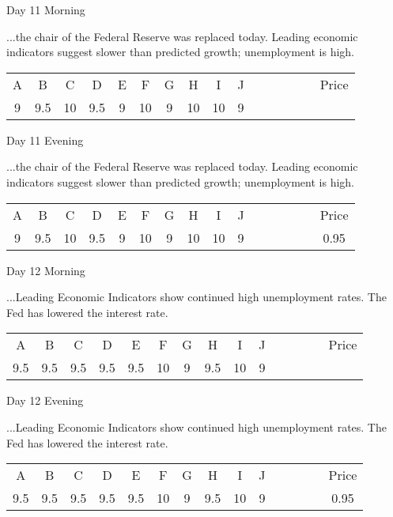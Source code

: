 \documentclass[notes=show]{beamer}
\begin{document}
\begin{frame}{Day 11 Morning}

\qquad ...the chair of the Federal Reserve was replaced
today. Leading economic indicators suggest slower than predicted growth;
unemployment is high.

\bigskip

\begin{center}
\begin{tabular}{cccccccccccccccc}
A & B & C & D & E & F & G & H & I & J &  &  &  &  &  & Price \\ 
9 & 9.5 & 10 & 9.5 & 9 & 10 & 9 & 10 & 10 & 9 &  &  &  &  &  & 
\end{tabular}
\end{center}
\end{frame}

\begin{frame}{Day 11 Evening}

\qquad ...the chair of the Federal Reserve was replaced
today. Leading economic indicators suggest slower than predicted growth;
unemployment is high.

\bigskip

\begin{center}
\begin{tabular}{cccccccccccccccc}
A & B & C & D & E & F & G & H & I & J &  &  &  &  &  & Price \\ 
9 & 9.5 & 10 & 9.5 & 9 & 10 & 9 & 10 & 10 & 9 &  &  &  &  &  & 0.95%
\end{tabular}
\end{center}
\end{frame}

\begin{frame}{Day 12 Morning}

\qquad ...Leading Economic Indicators show continued
high unemployment rates. The Fed has lowered the interest rate.

\bigskip

\begin{center}
\begin{tabular}{ccccccccccccccc}
A & B & C & D & E & F & G & H & I & J &  &  &  &  & Price \\ 
9.5 & 9.5 & 9.5 & 9.5 & 9.5 & 10 & 9 & 9.5 & 10 & 9 &  &  &  &  & 
\end{tabular}
\end{center}
\end{frame}

\begin{frame}{Day 12 Evening}

\qquad ...Leading Economic Indicators show continued
high unemployment rates. The Fed has lowered the interest rate.

\bigskip

\begin{center}
\begin{tabular}{ccccccccccccccc}
A & B & C & D & E & F & G & H & I & J &  &  &  &  & Price \\ 
9.5 & 9.5 & 9.5 & 9.5 & 9.5 & 10 & 9 & 9.5 & 10 & 9 &  &  &  &  & 0.95%
\end{tabular}
\end{center}
\end{frame}
\end{document}
